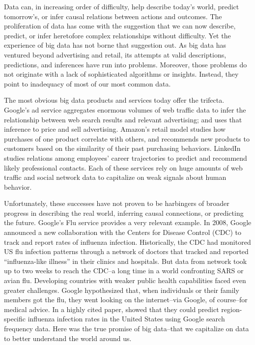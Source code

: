 \documentclass[12pt]{article}
\begin{document}
Data can, in increasing order of difficulty, help describe today's
world, predict tomorrow's, or infer causal relations between actions
and outcomes. The proliferation of data has come with the suggestion
that we can now describe, predict, or infer heretofore complex
relationships without difficulty. Yet the experience of big data has
not borne that suggestion out. As big data has ventured beyond
advertising and retail, its attempts at valid descriptions,
predictions, and inferences have run into problems. Moreover, those
problems do not originate with a lack of sophisticated algorithms or
insights. Instead, they point to inadequacy of most of our most common
data. 

The most obvious big data products and services today offer the
trifecta. Google's ad service aggregates enormous volumes of web traffic
data to infer the relationship between web search results and relevant
advertising; and uses that inference to price and sell
advertising. Amazon's retail model studies how purchases of one
product correlate with others, and recommends new products to
customers based on the similarity of their past purchasing
behaviors. LinkedIn studies relations among employees' career
trajectories to predict and recommend likely professional
contacts. Each of these services rely on huge amounts of web traffic
and social network data to capitalize on weak signals about human
behavior. 

Unfortunately, these successes have not proven to be harbingers of
broader progress in describing the real world, inferring causal
connections, or predicting the future. Google's Flu service
provides a very relevant example. In 2008, Google announced a new
collaboration with the Centers for Disease Control (CDC) to track and report
rates of influenza infection. Historically, the CDC had monitored US
flu infection patterns through a network of doctors that tracked and
reported ``influenza-like illness'' in their clinics and
hospitals. But data from network took up to two weeks to reach the
CDC--a long time in a world confronting SARS or avian flu. Developing
countries with weaker public health capabilities faced even greater
challenges. Google hypothesized that, when individuals or their family
members got the flu, they went looking on the internet--via Google, of
course--for medical
advice. In a highly cited paper, \cite{ginsberg2008detecting} showed
that they could predict region-specific influenza infection rates in the United
States using Google search frequency data. Here was the true promise
of big data--that we capitalize on data to better understand the world around us. 
\end{document}
